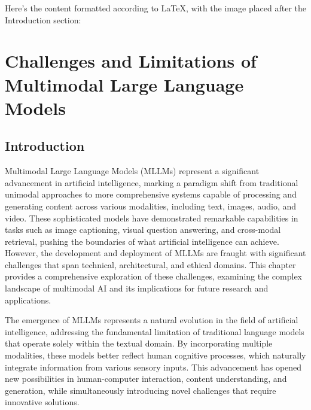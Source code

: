Here's the content formatted according to LaTeX, with the image placed after the Introduction section:

\chapter{Challenges and Limitations of Multimodal Large Language Models}


\section{Introduction}
Multimodal Large Language Models (MLLMs) represent a significant advancement in artificial intelligence, marking a paradigm shift from traditional unimodal approaches to more comprehensive systems capable of processing and generating content across various modalities, including text, images, audio, and video. These sophisticated models have demonstrated remarkable capabilities in tasks such as image captioning, visual question answering, and cross-modal retrieval, pushing the boundaries of what artificial intelligence can achieve. However, the development and deployment of MLLMs are fraught with significant challenges that span technical, architectural, and ethical domains. This chapter provides a comprehensive exploration of these challenges, examining the complex landscape of multimodal AI and its implications for future research and applications.

The emergence of MLLMs represents a natural evolution in the field of artificial intelligence, addressing the fundamental limitation of traditional language models that operate solely within the textual domain. By incorporating multiple modalities, these models better reflect human cognitive processes, which naturally integrate information from various sensory inputs. This advancement has opened new possibilities in human-computer interaction, content understanding, and generation, while simultaneously introducing novel challenges that require innovative solutions.

